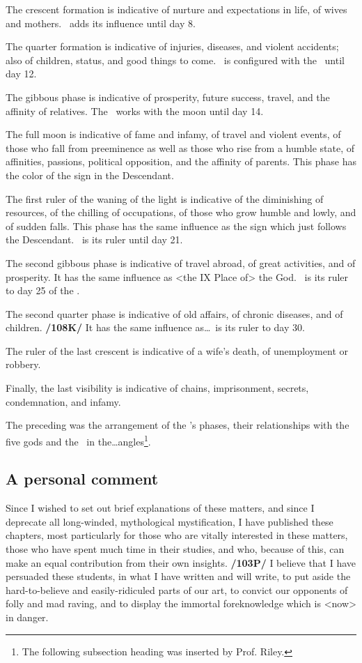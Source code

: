 The crescent formation is indicative of nurture and expectations in life, of wives and mothers. \Mercury\, adds its influence until day 8.

The quarter formation is indicative of injuries, diseases, and violent accidents; also of children, status, and good things to come. \Venus\, is configured with the \Moon\, until day 12.

The gibbous phase is indicative of prosperity, future success, travel, and the affinity of relatives. The \Sun\, works with the moon until day 14.

The full moon is indicative of fame and infamy, of travel and violent events, of those who fall from preeminence as well as those who rise from a humble state, of affinities, passions, political opposition, and the affinity of parents. This phase has the color of the sign in the Descendant.

The first ruler of the waning of the light is indicative of the diminishing of resources, of the chilling of occupations, of those who grow humble and lowly, and of sudden falls. This phase has the same influence as the sign which just follows the Descendant. \Mars\, is its ruler until day 21.

The second gibbous phase is indicative of travel abroad, of great activities, and of prosperity. It has the same influence as <the IX Place of> the God. \Jupiter\, is its ruler to day 25 of the \Moon.

The second quarter phase is indicative of old affairs, of chronic diseases, and of children. \textbf{/108K/} It has
the same influence as\ldots \Saturn\, is its ruler to day 30.

The ruler of the last crescent is indicative of a wife’s death, of unemployment or robbery. 

Finally, the last visibility is indicative of chains, imprisonment, secrets, condemnation, and infamy.

The preceding was the arrangement of the \Moon’s phases, their relationships with the five gods and the \Sun\, in the\ldots angles\footnote{The following subsection heading was inserted by Prof. Riley.}.

\subsection{\textlangle A personal comment\textrangle}

Since I wished to set out brief explanations of these matters, and since I deprecate all long-winded, mythological mystification, I have published these chapters, most particularly for those who are vitally interested in these matters, those who have spent much time in their studies, and who, because of this, can
make an equal contribution from their own insights. \textbf{/103P/} I believe that I have persuaded these students, in what I have written and will write, to put aside the hard-to-believe and easily-ridiculed parts of our art, to convict our opponents of folly and mad raving, and to display the immortal foreknowledge which is <now> in danger. 

